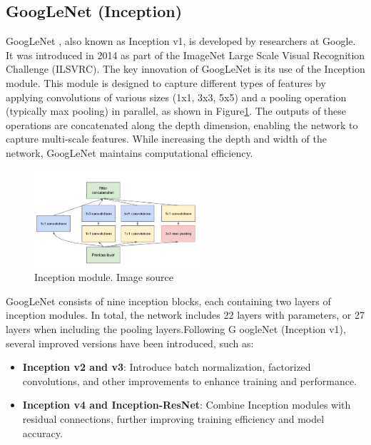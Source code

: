 \subsection{GoogLeNet (Inception)} 
GoogLeNet \cite{GoogleNet2015}, also known as Inception v1, is developed by researchers at Google. It was introduced in 2014 as part of the ImageNet Large Scale Visual Recognition Challenge (ILSVRC).  The key innovation of GoogLeNet is its use of the Inception module. This module is designed to capture different types of features by applying convolutions of various sizes (1x1, 3x3, 5x5) and a pooling operation (typically max pooling) in parallel, as shown in Figure\ref{fig:inception}. The outputs of these operations are concatenated along the depth dimension, enabling the network to capture multi-scale features. While increasing the depth and width of the network, GoogLeNet maintains computational efficiency.

\vspace{0.5em}
\begin{figure}[h]%
\centering 
\includegraphics[width=0.55\textwidth]{imgs/inception1.png}
\caption{Inception module. Image source \cite{GoogleNet2015}}\label{fig:inception}
\end{figure}

GoogLeNet consists of nine inception blocks, each containing two layers of inception modules. In total, the network includes 22 layers with parameters, or 27 layers when including the pooling layers.Following G oogleNet (Inception v1), several improved versions have been introduced, such as:
\begin{itemize}[b]
  \item \textbf{Inception v2 and v3}: Introduce batch normalization, factorized convolutions, and other improvements to enhance training and performance.
  \item \textbf{Inception v4 and Inception-ResNet}: Combine Inception modules with residual connections, further improving training efficiency and model accuracy.
\end{itemize}

